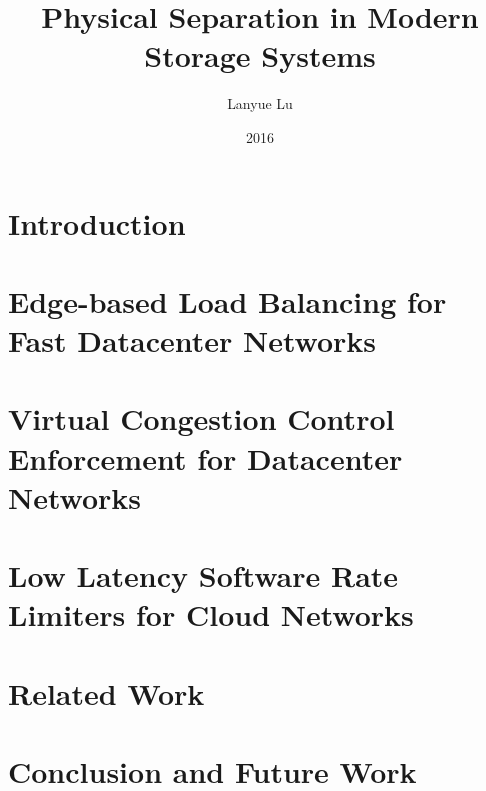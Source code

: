 \documentclass[12pt, letterpaper, oldfontcommands]{memoir}
\title{Physical Separation in Modern Storage Systems}
\author{Lanyue Lu}
\date{2016 \vspace{-1in}}
\begin{document}

\ifdef{\ShortenThesis}{
}{
  
}

\chapter{Introduction}
\label{thesis:chapter:intro}


\chapter{Edge-based Load Balancing for Fast Datacenter Networks}
\label{thesis:chapter:presto}


\chapter{Virtual Congestion Control Enforcement for Datacenter Networks}
\label{thesis:chapter:acdctcp}



\chapter{Low Latency Software Rate Limiters for Cloud Networks}
\label{thesis:chapter:rate_limiter}


\chapter{Related Work}
\label{thesis:chapter:related}


\chapter{Conclusion and Future Work}
\label{thesis:chapter:conclusion}






\end{document}
